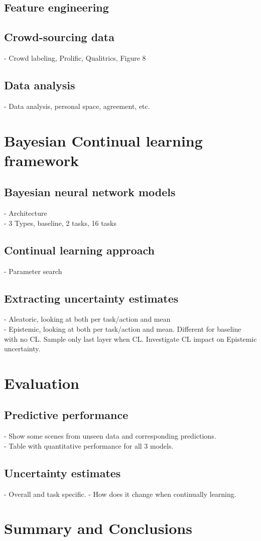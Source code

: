\documentclass[a4paper,12pt]{report}
\begin{document}
\section{Feature engineering}
\section{Crowd-sourcing data}
- Crowd labeling, Prolific, Qualitrics, Figure 8

\section{Data analysis}
- Data analysis, personal space, agreement, etc.

\chapter{Bayesian Continual learning framework}
\section{Bayesian neural network models}
- Architecture
\\
- 3 Types, baseline, 2 tasks, 16 tasks
\\
\section{Continual learning approach}
- Parameter search
\\
\section{Extracting uncertainty estimates}
- Aleatoric, looking at both per task/action and mean
\\
- Epistemic, looking at both per task/action and mean. Different for baseline with no CL. Sample only last layer when CL. Investigate CL impact on Epistemic uncertainty.


\chapter{Evaluation} 
\section{Predictive performance}
- Show some scenes from unseen data and corresponding predictions.
\\
- Table with quantitative performance for all 3 models.

\section{Uncertainty estimates}
- Overall and task specific.
- How does it change when continually learning.


\chapter{Summary and Conclusions} 

\appendix
\singlespacing

 
 
\end{document}
